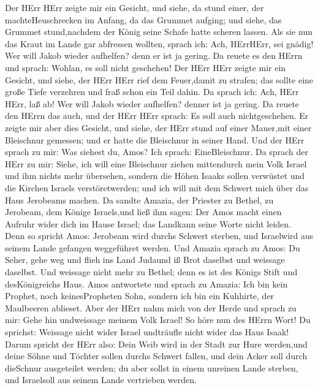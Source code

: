  Der HErr HErr zeigte mir ein Gesicht, und siehe, da stund
einer, der machteHeuschrecken im Anfang, da das Grummet aufging; und
siehe, das Grummet stund,nachdem der König seine Schafe hatte scheren
lassen.  Als sie nun das Kraut im Lande gar abfressen
wollten, sprach ich: Ach, HErrHErr, sei gnädig! Wer will Jakob wieder
aufhelfen? denn er ist ja gering.  Da reuete es den HErrn
und sprach: Wohlan, es soll nicht geschehen!  Der HErr HErr
zeigte mir ein Gesicht, und siehe, der HErr HErr rief dem Feuer,damit zu
strafen; das sollte eine große Tiefe verzehren und fraß schon ein Teil
dahin.  Da sprach ich: Ach, HErr HErr, laß ab! Wer will
Jakob wieder aufhelfen? denner ist ja gering.  Da reuete den
HErrn das auch, und der HErr HErr sprach: Es soll auch nichtgeschehen.
 Er zeigte mir aber dies Gesicht, und siehe, der HErr stund
auf einer Mauer,mit einer Bleischnur gemessen; und er hatte die
Bleischnur in seiner Hand.  Und der HErr sprach zu mir: Was
siehest du, Amos? Ich sprach: EineBleischnur. Da sprach der HErr zu mir:
Siehe, ich will eine Bleischnur ziehen mittendurch mein Volk Israel und
ihm nichts mehr übersehen,  sondern die Höhen Isaaks sollen
verwüstet und die Kirchen Israels verstöretwerden; und ich will mit dem
Schwert mich über das Haus Jerobeams machen.  Da sandte
Amazia, der Priester zu Bethel, zu Jerobeam, dem Könige Israels,und ließ
ihm sagen: Der Amos macht einen Aufruhr wider dich im Hause Israel; das
Landkann seine Worte nicht leiden.  Denn so spricht Amos:
Jerobeam wird durchs Schwert sterben, und Israelwird aus seinem Lande
gefangen weggeführet werden.  Und Amazia sprach zu Amos: Du
Seher, gehe weg und flieh ins Land Judaund iß Brot daselbst und weissage
daselbst.  Und weissage nicht mehr zu Bethel; denn es ist
des Königs Stift und desKönigreichs Haus.  Amos antwortete
und sprach zu Amazia: Ich bin kein Prophet, noch keinesPropheten Sohn,
sondern ich bin ein Kuhhirte, der Maulbeeren ablieset. 
Aber der HErr nahm mich von der Herde und sprach zu mir: Gehe hin
undweissage meinem Volk Israel!  So höre nun des HErrn
Wort! Du sprichst: Weissage nicht wider Israel undträufle nicht wider
das Haus Isaak!  Darum spricht der HErr also: Dein Weib
wird in der Stadt zur Hure werden,und deine Söhne und Töchter sollen
durchs Schwert fallen, und dein Acker soll durch dieSchnur ausgeteilet
werden; du aber sollst in einem unreinen Lande sterben, und Israelsoll
aus seinem Lande vertrieben werden.

